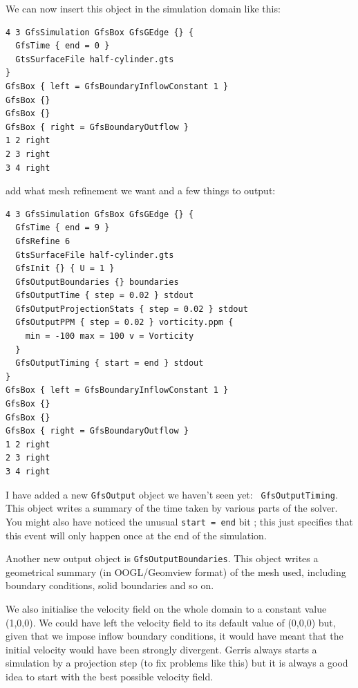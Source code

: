 \documentclass[a4paper]{article}
\begin{document}
We can now insert this object in the simulation domain like this:
\begin{verbatim}
4 3 GfsSimulation GfsBox GfsGEdge {} {
  GfsTime { end = 0 }
  GtsSurfaceFile half-cylinder.gts
}
GfsBox { left = GfsBoundaryInflowConstant 1 }
GfsBox {}
GfsBox {}
GfsBox { right = GfsBoundaryOutflow }
1 2 right
2 3 right
3 4 right
\end{verbatim}
add what mesh refinement we want and a few things to output:
\begin{verbatim}
4 3 GfsSimulation GfsBox GfsGEdge {} {
  GfsTime { end = 9 }
  GfsRefine 6
  GtsSurfaceFile half-cylinder.gts
  GfsInit {} { U = 1 }
  GfsOutputBoundaries {} boundaries
  GfsOutputTime { step = 0.02 } stdout
  GfsOutputProjectionStats { step = 0.02 } stdout
  GfsOutputPPM { step = 0.02 } vorticity.ppm { 
    min = -100 max = 100 v = Vorticity 
  }
  GfsOutputTiming { start = end } stdout
}
GfsBox { left = GfsBoundaryInflowConstant 1 }
GfsBox {}
GfsBox {}
GfsBox { right = GfsBoundaryOutflow }
1 2 right
2 3 right
3 4 right
\end{verbatim}
I have added a new {\tt GfsOutput} object we haven't seen yet: {\tt
GfsOutputTiming}. This object writes a summary of the time taken by
various parts of the solver. You might also have noticed the unusual
{\tt start = end} bit ; this just specifies that this event will only
happen once at the end of the simulation.

Another new output object is {\tt GfsOutputBoundaries}. This object
writes a geometrical summary (in {\sc OOGL}/Geomview format) of the mesh
used, including boundary conditions, solid boundaries and so on.

We also initialise the velocity field on the whole domain
to a constant value (1,0,0). We could have left the
velocity field to its default value of (0,0,0) but, given that we
impose inflow boundary conditions, it would have meant that the
initial velocity would have been strongly divergent. Gerris always
starts a simulation by a projection step (to fix problems like this)
but it is always a good idea to start with the best possible velocity
field.
\end{document}
